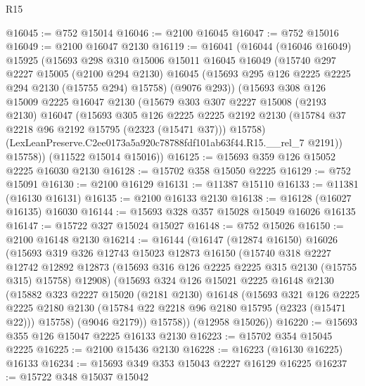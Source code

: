 \begin{lexlean}{R15}
\begin{coremodule}
@16045 := @752 @15014
@16046 := @2100 @16045
@16047 := @752 @15016
@16049 := @2100 @16047 @2130
@16119 := @16041
    (@16044
      (@16046 @16049)
      @15925
      (@15693
        @298
        @310
        @15006
        @15011
        @16045
        @16049
        (@15740
          @297
          @2227
          @15005
          (@2100 @294 @2130)
          @16045
          (@15693 @295 @126 @2225 @2225 @294 @2130 (@15755 @294) @15758)
          (@9076 @293))
        (@15693
          @308
          @126
          @15009
          @2225
          @16047
          @2130
          (@15679
            @303
            @307
            @2227
            @15008
            (@2193 @2130)
            @16047
            (@15693
              @305
              @126
              @2225
              @2225
              @2192
              @2130
              (@15784 @37 @2218 @96 @2192 @15795 (@2323 (@15471 @37)))
              @15758)
            (LexLeanPreserve.C2ee0173a5a920c78788fdf101ab63f44.R15.__rel_7 @2191))
          @15758))
      (@11522 @15014 @15016))
@16125 := @15693 @359 @126 @15052 @2225 @16030 @2130
@16128 := @15702 @358 @15050 @2225
@16129 := @752 @15091
@16130 := @2100 @16129
@16131 := @11387 @15110
@16133 := @11381 (@16130 @16131)
@16135 := @2100 @16133 @2130
@16138 := @16128 (@16027 @16135) @16030
@16144 := @15693 @328 @357 @15028 @15049 @16026 @16135
@16147 := @15722 @327 @15024 @15027
@16148 := @752 @15026
@16150 := @2100 @16148 @2130
@16214 := @16144
    (@16147
      (@12874 @16150)
      @16026
      (@15693
        @319
        @326
        @12743
        @15023
        @12873
        @16150
        (@15740
          @318
          @2227
          @12742
          @12892
          @12873
          (@15693 @316 @126 @2225 @2225 @315 @2130 (@15755 @315) @15758)
          @12908)
        (@15693
          @324
          @126
          @15021
          @2225
          @16148
          @2130
          (@15882
            @323
            @2227
            @15020
            (@2181 @2130)
            @16148
            (@15693
              @321
              @126
              @2225
              @2225
              @2180
              @2130
              (@15784 @22 @2218 @96 @2180 @15795 (@2323 (@15471 @22)))
              @15758)
            (@9046 @2179))
          @15758))
      (@12958 @15026))
@16220 := @15693 @355 @126 @15047 @2225 @16133 @2130
@16223 := @15702 @354 @15045 @2225
@16225 := @2100 @15436 @2130
@16228 := @16223 (@16130 @16225) @16133
@16234 := @15693 @349 @353 @15043 @2227 @16129 @16225
@16237 := @15722 @348 @15037 @15042

\end{coremodule}
\end{lexlean}
